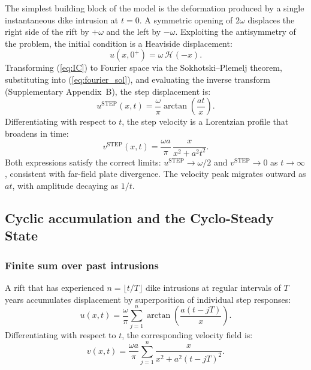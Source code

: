 \documentclass[12pt]{article}
\begin{document}
The simplest building block of the model is the deformation produced by a
single instantaneous dike intrusion at $t = 0$. A symmetric opening of $2\omega$
displaces the right side of the rift by $+\omega$ and the left by $-\omega$.
Exploiting the antisymmetry of the problem, the initial condition is a Heaviside
displacement:
\begin{equation}
u(x,0^+) = \omega\,\mathcal{H}(-x).
\label{eq:IC}
\end{equation}
Transforming (\ref{eq:IC}) to Fourier space via the Sokhotski--Plemelj theorem,
substituting into (\ref{eq:fourier_sol}), and evaluating the inverse transform
(Supplementary Appendix~B), the step displacement is:
\begin{equation}
\boxed{u^{\text{STEP}}(x,t) = \frac{\omega}{\pi}\arctan\!\left(\frac{at}{x}\right).}
\label{eq:step}
\end{equation}
Differentiating with respect to $t$, the step velocity is a Lorentzian
profile that broadens in time:
\begin{equation}
v^{\text{STEP}}(x,t) = \frac{\omega a}{\pi}\,\frac{x}{x^2 + a^2t^2}.
\label{eq:stepv}
\end{equation}
Both expressions satisfy the correct limits: $u^{\text{STEP}}\to\omega/2$ and
$v^{\text{STEP}}\to 0$ as $t\to\infty$, consistent with far-field plate
divergence. The velocity peak migrates outward as $at$, with amplitude decaying
as $1/t$.

\subsection{Cyclic accumulation and the Cyclo-Steady State}
\label{sec:css}

\subsubsection{Finite sum over past intrusions}

A rift that has experienced $n = \lfloor t/T \rfloor$ dike intrusions at
regular intervals of $T$ years accumulates displacement by superposition of
individual step responses:
\begin{equation}
u(x,t) = \frac{\omega}{\pi}\sum_{j=1}^{n}
  \arctan\!\left(\frac{a(t-jT)}{x}\right).
\label{eq:finite_sum}
\end{equation}
Differentiating with respect to $t$, the corresponding velocity field is:
\begin{equation}
v(x,t) = \frac{\omega a}{\pi}\sum_{j=1}^{n}
  \frac{x}{x^2 + a^2(t-jT)^2}.
\label{eq:finite_sum_v}
\end{equation}
\end{document}
